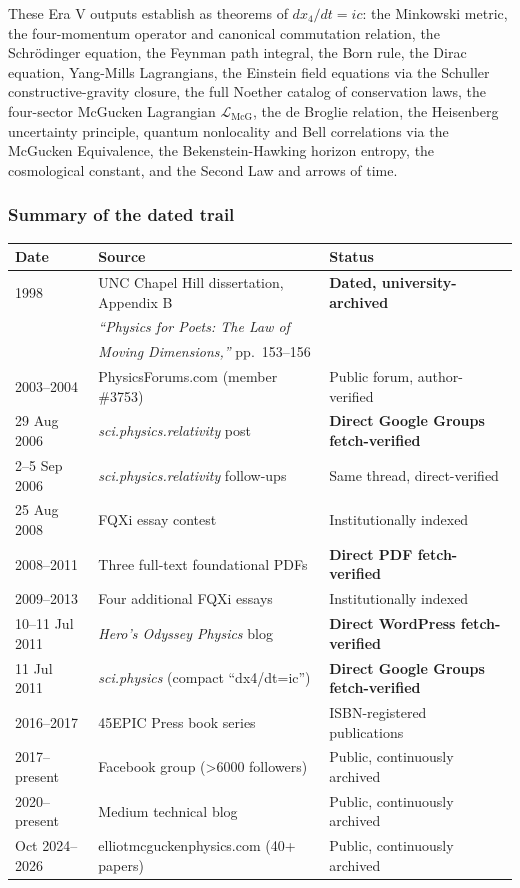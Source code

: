 \documentclass[11pt,a4paper]{article}
\begin{document}
These Era V outputs establish as theorems of $dx_4/dt = ic$: the Minkowski metric, the four-momentum operator and canonical commutation relation, the Schr\"odinger equation, the Feynman path integral, the Born rule, the Dirac equation, Yang-Mills Lagrangians, the Einstein field equations via the Schuller constructive-gravity closure, the full Noether catalog of conservation laws, the four-sector McGucken Lagrangian $\mathcal{L}_{\text{McG}}$, the de Broglie relation, the Heisenberg uncertainty principle, quantum nonlocality and Bell correlations via the McGucken Equivalence, the Bekenstein-Hawking horizon entropy, the cosmological constant, and the Second Law and arrows of time.

\subsubsection{Summary of the dated trail}

\begin{center}
\begin{tabular}{lll}
\hline
\textbf{Date} & \textbf{Source} & \textbf{Status} \\
\hline
1998 & UNC Chapel Hill dissertation, Appendix B & \textbf{Dated, university-archived} \\
   & \emph{``Physics for Poets: The Law of} & \\
   & \emph{Moving Dimensions,''} pp.\ 153--156 & \\
2003--2004 & PhysicsForums.com (member \#3753) & Public forum, author-verified \\
29 Aug 2006 & \emph{sci.physics.relativity} post & \textbf{Direct Google Groups fetch-verified} \\
2--5 Sep 2006 & \emph{sci.physics.relativity} follow-ups & Same thread, direct-verified \\
25 Aug 2008 & FQXi essay contest & Institutionally indexed \\
2008--2011 & Three full-text foundational PDFs & \textbf{Direct PDF fetch-verified} \\
2009--2013 & Four additional FQXi essays & Institutionally indexed \\
10--11 Jul 2011 & \emph{Hero's Odyssey Physics} blog & \textbf{Direct WordPress fetch-verified} \\
11 Jul 2011 & \emph{sci.physics} (compact ``dx4/dt=ic'') & \textbf{Direct Google Groups fetch-verified} \\
2016--2017 & 45EPIC Press book series & ISBN-registered publications \\
2017--present & Facebook group (>6000 followers) & Public, continuously archived \\
2020--present & Medium technical blog & Public, continuously archived \\
Oct 2024--2026 & elliotmcguckenphysics.com (40+ papers) & Public, continuously archived \\
\hline
\end{tabular}
\end{center}
\end{document}
